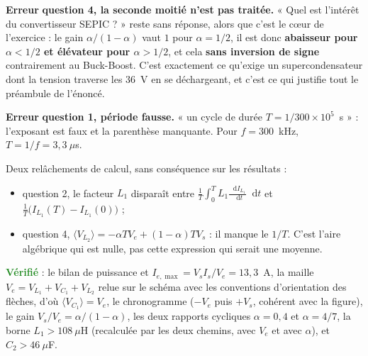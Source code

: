 \documentclass[a4paper,11pt]{article}
\newcommand*\dif{\mathop{}\!\mathrm{d}}
\newcommand{\erreur}{\textcolor{BrickRed}{\textbf{Erreur}}}
\newcommand{\verifie}{\textcolor{ForestGreen}{\textbf{Vérifié}}}
\begin{document}
\medskip
\erreur{} \textbf{question 4, la seconde moitié n'est pas traitée.} « Quel est l'intérêt du
convertisseur SEPIC ? » reste sans réponse, alors que c'est le cœur de l'exercice : le gain
$\alpha/(1-\alpha)$ vaut $1$ pour $\alpha=1/2$, il est donc \textbf{abaisseur pour $\alpha<1/2$ et
élévateur pour $\alpha>1/2$}, et cela \textbf{sans inversion de signe} contrairement au Buck-Boost.
C'est exactement ce qu'exige un supercondensateur dont la tension traverse les $36$~V en se
déchargeant, et c'est ce qui justifie tout le préambule de l'énoncé.

\medskip
\erreur{} \textbf{question 1, période fausse.} « un cycle de durée $T=1/300\times10^5$~s » : l'exposant
est faux et la parenthèse manquante. Pour $f=300$~kHz, $T=1/f=3{,}3~\mu$s.

\medskip
Deux relâchements de calcul, sans conséquence sur les résultats :
\begin{itemize}
	\item question 2, le facteur $L_1$ disparaît entre $\frac{1}{T}\int_0^T L_1\frac{\dif I_{L_1}}{\dif t}\dif t$
	et $\frac{1}{T}\big(I_{L_1}(T)-I_{L_1}(0)\big)$ ;
	\item question 4, $\langle V_{L_2}\rangle=-\alpha T V_e+(1-\alpha)TV_s$ : il manque le $1/T$. C'est
	l'aire algébrique qui est nulle, pas cette expression qui serait une moyenne.
\end{itemize}

\medskip
\verifie{} : le bilan de puissance et $I_{e,\max}=V_sI_s/V_e=13{,}3$~A, la maille
$V_e=V_{L_1}+V_{C_1}+V_{L_2}$ relue sur le schéma avec les conventions d'orientation des flèches,
d'où $\langle V_{C_1}\rangle=V_e$, le chronogramme ($-V_e$ puis $+V_s$, cohérent avec la figure), le
gain $V_s/V_e=\alpha/(1-\alpha)$, les deux rapports cycliques $\alpha=0{,}4$ et $\alpha=4/7$, la
borne $L_1>108~\mu$H (recalculée par les deux chemins, avec $V_e$ et avec $\alpha$), et
$C_2>46~\mu$F.
\end{document}

